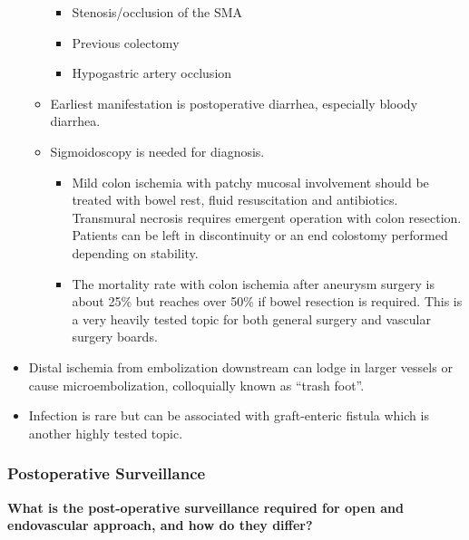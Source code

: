 \documentclass[
]{book}
\begin{document}
\begin{itemize}
\begin{itemize}
    \begin{itemize}
    \item
      Stenosis/occlusion of the SMA
    \item
      Previous colectomy
    \item
      Hypogastric artery occlusion
    \end{itemize}
  \item
    Earliest manifestation is postoperative diarrhea, especially
    bloody diarrhea.
  \item
    Sigmoidoscopy is needed for diagnosis.

    \begin{itemize}
    \item
      Mild colon ischemia with patchy mucosal involvement should
      be treated with bowel rest, fluid resuscitation and
      antibiotics. Transmural necrosis requires emergent operation
      with colon resection. Patients can be left in discontinuity
      or an end colostomy performed depending on stability.
    \item
      The mortality rate with colon ischemia after aneurysm
      surgery is about 25\% but reaches over 50\% if bowel resection
      is required.\citep{brewsterIntestinalIschemiaComplicating1991}
      This is a very heavily tested topic for both general surgery
      and vascular surgery boards.
    \end{itemize}
  \end{itemize}
\item
  Distal ischemia from embolization downstream can lodge in larger
  vessels or cause microembolization, colloquially known as ``trash
  foot''.
\item
  Infection is rare but can be associated with graft-enteric fistula
  which is another highly tested topic.
\end{itemize}

\hypertarget{postoperative-surveillance}{%
\subsubsection{Postoperative Surveillance}\label{postoperative-surveillance}}

\textbf{What is the post-operative surveillance required for open and
endovascular approach, and how do they differ?}
\citep{mooreVascularEndovascularSurgery2019}
\end{document}

